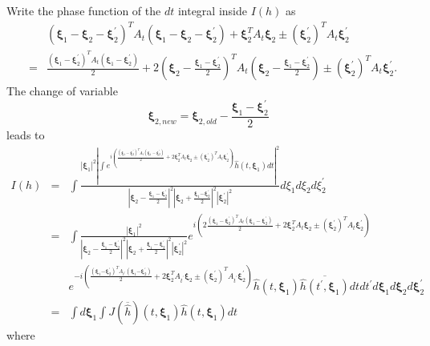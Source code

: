 \documentclass[reqno]{amsart}
\theoremstyle{plain}
\numberwithin{equation}{section}
\begin{document}
Write the phase function of the $dt$ integral inside $I(h)$ as\begin{eqnarray*}
&&\left( \mathbf{\xi }_{1}-\mathbf{\xi }_{2}-\mathbf{\xi }_{2}^{\prime
}\right) ^{T}A_{t}\left( \mathbf{\xi }_{1}-\mathbf{\xi }_{2}-\mathbf{\xi }_{2}^{\prime }\right) +\mathbf{\xi }_{2}^{T}A_{t}\mathbf{\xi }_{2}\pm \left( 
\mathbf{\xi }_{2}^{\prime }\right) ^{T}A_{t}\mathbf{\xi }_{2}^{\prime } \\
&=&\frac{\left( \mathbf{\xi }_{1}-\mathbf{\xi }_{2}^{\prime }\right)
^{T}A_{t}\left( \mathbf{\xi }_{1}-\mathbf{\xi }_{2}^{\prime }\right) }{2}+2\left( \mathbf{\xi }_{2}-\frac{\mathbf{\xi }_{1}-\mathbf{\xi }_{2}^{\prime
}}{2}\right) ^{T}A_{t}\left( \mathbf{\xi }_{2}-\frac{\mathbf{\xi }_{1}-\mathbf{\xi }_{2}^{\prime }}{2}\right) \pm \left( \mathbf{\xi }_{2}^{\prime
}\right) ^{T}A_{t}\mathbf{\xi }_{2}^{\prime }.
\end{eqnarray*}The change of variable\begin{equation}
\mathbf{\xi }_{2,new}=\mathbf{\xi }_{2,old}-\frac{\mathbf{\xi }_{1}-\mathbf{\xi }_{2}^{\prime }}{2}  \label{formula:change of variable 3*3d sphere}
\end{equation}leads to\begin{eqnarray*}
I(h) &=&\int \frac{\left\vert \mathbf{\xi }_{1}\right\vert ^{2}\left\vert
\int e^{i(\frac{\left( \mathbf{\xi }_{1}-\mathbf{\xi }_{2}^{\prime }\right)
^{T}A_{t}\left( \mathbf{\xi }_{1}-\mathbf{\xi }_{2}^{\prime }\right) }{2}+2\mathbf{\xi }_{2}^{T}A_{t}\mathbf{\xi }_{2}\pm \left( \mathbf{\xi }_{2}^{\prime }\right) ^{T}A_{t}\mathbf{\xi }_{2}^{\prime })}\hat{h}(t,\mathbf{\xi }_{1})dt\right\vert ^{2}}{\left\vert \mathbf{\xi }_{2}-\frac{\mathbf{\xi }_{1}-\mathbf{\xi }_{2}^{\prime }}{2}\right\vert ^{2}\left\vert 
\mathbf{\xi }_{2}+\frac{\mathbf{\xi }_{1}\mathbf{-\xi }_{2}^{\prime }}{2}\right\vert ^{2}\left\vert \mathbf{\xi }_{2}^{\prime }\right\vert ^{2}}d\xi
_{1}d\xi _{2}d\xi _{2}^{\prime } \\
&=&\int \frac{\left\vert \mathbf{\xi }_{1}\right\vert ^{2}}{\left\vert 
\mathbf{\xi }_{2}-\frac{\mathbf{\xi }_{1}-\mathbf{\xi }_{2}^{\prime }}{2}\right\vert ^{2}\left\vert \mathbf{\xi }_{2}+\frac{\mathbf{\xi }_{1}-\mathbf{\xi }_{2}^{\prime }}{2}\right\vert ^{2}\left\vert \mathbf{\xi }_{2}^{\prime
}\right\vert ^{2}}e^{i(2\frac{\left( \mathbf{\xi }_{1}-\mathbf{\xi }_{2}^{\prime }\right) ^{T}A_{t}\left( \mathbf{\xi }_{1}-\mathbf{\xi }_{2}^{\prime }\right) }{2}+2\mathbf{\xi }_{2}^{T}A_{t}\mathbf{\xi }_{2}\pm
\left( \mathbf{\xi }_{2}^{\prime }\right) ^{T}A_{t}\mathbf{\xi }_{2}^{\prime
})} \\
&&e^{-i(\frac{\left( \mathbf{\xi }_{1}\mathbf{-\xi }_{2}^{\prime }\right)
^{T}A_{t^{\prime }}\left( \mathbf{\xi }_{1}\mathbf{-\xi }_{2}^{\prime
}\right) }{2}+2\mathbf{\xi }_{2}^{T}A_{t^{\prime }}\mathbf{\xi }_{2}\pm
\left( \mathbf{\xi }_{2}^{\prime }\right) ^{T}A_{t^{\prime }}\mathbf{\xi }_{2}^{\prime })}\hat{h}(t,\mathbf{\xi }_{1})\overline{\hat{h}(t^{\prime },\mathbf{\xi }_{1})}dtdt^{\prime }d\mathbf{\xi }_{1}d\mathbf{\xi }_{2}d\mathbf{\xi }_{2}^{\prime } \\
&=&\int d\mathbf{\xi }_{1}\int J(\overline{\hat{h}})(t,\mathbf{\xi }_{1})\hat{h}(t,\mathbf{\xi }_{1})dt
\end{eqnarray*}where 
\end{document}
